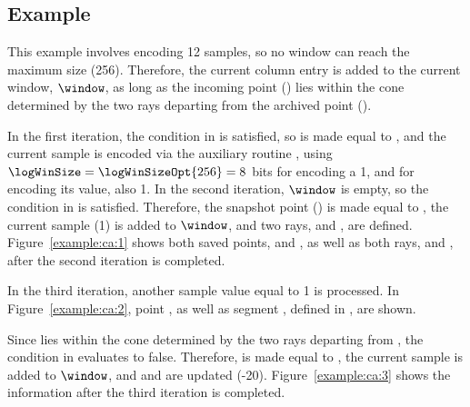 




\subsection{Example}
\label{algo:ca:example}


\exampleIntro{\ref{example:ca:1}}


This example involves encoding 12 samples, so no window can reach the maximum size (256). Therefore, the current column entry is added to the current window, $\window$, as long as the incoming point (\incoming) lies within the cone determined by the two rays departing from the archived point (\archived).


In the first iteration, the condition in  is satisfied, so \archived is made equal to , and the current sample is encoded via the auxiliary routine \CAWinStart, using $\logWinSize = \logWinSizeOpt{256}=8$ bits for encoding a 1, and \tobitexp for encoding its value, also 1. In the second iteration, $\window$ is empty, so the condition in  is satisfied. Therefore, the snapshot point (\snapshot) is made equal to , the current sample (1) is added to $\window$, and two rays, \smin and \smax, are defined. Figure~\ref{example:ca:1} shows both saved points, \archived and \snapshot, as well as both rays, \smin and \smax, after the second iteration is completed.




In the third iteration, another sample value equal to 1 is processed. In Figure~\ref{example:ca:2}, point , as well as segment , defined in , are shown.




\clearpage


Since  lies within the cone determined by the two rays departing from \archived, the condition in  evaluates to false. Therefore, \snapshot is made equal to , the current sample is added to $\window$, and \smin and \smax are updated (-20). Figure~\ref{example:ca:3} shows the information after the third iteration is completed.


